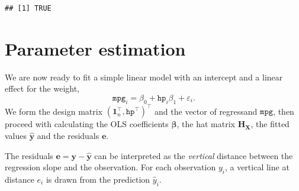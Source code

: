 \documentclass[]{book}
\newenvironment{Shaded}{\begin{snugshade}}{\end{snugshade}}
\newcommand{\KeywordTok}[1]{\textcolor[rgb]{0.13,0.29,0.53}{\textbf{#1}}}
\newcommand{\DecValTok}[1]{\textcolor[rgb]{0.00,0.00,0.81}{#1}}
\newcommand{\StringTok}[1]{\textcolor[rgb]{0.31,0.60,0.02}{#1}}
\newcommand{\CommentTok}[1]{\textcolor[rgb]{0.56,0.35,0.01}{\textit{#1}}}
\newcommand{\OperatorTok}[1]{\textcolor[rgb]{0.81,0.36,0.00}{\textbf{#1}}}
\newcommand{\NormalTok}[1]{#1}
\theoremstyle{definition}
\theoremstyle{definition}
\theoremstyle{definition}
\theoremstyle{remark}
\begin{document}
\begin{verbatim}
## [1] TRUE
\end{verbatim}

\section{Parameter estimation}\label{parameter-estimation}

We are now ready to fit a simple linear model with an intercept and a
linear effect for the weight,
\[ \texttt{mpg}_i = \beta_0 + \texttt{hp}_i\beta_1 +\varepsilon_i.\] We
form the design matrix
\((\boldsymbol{1}_n^\top, \texttt{hp}^\top)^\top\) and the vector of
regressand \(\texttt{mpg}\), then proceed with calculating the OLS
coefficients \(\hat{\boldsymbol{\beta}}\), the hat matrix
\(\mathbf{H}_{\mathbf{X}}\), the fitted values \(\hat{\boldsymbol{y}}\)
and the residuals \(\boldsymbol{e}\).

\begin{Shaded}
\end{Shaded}

The residuals \(\boldsymbol{e} = \boldsymbol{y} -\hat{\boldsymbol{y}}\)
can be interpreted as the \emph{vertical} distance between the
regression slope and the observation. For each observation \(y_i\), a
vertical line at distance \(e_i\) is drawn from the prediction
\(\hat{y}_i\).
\end{document}
